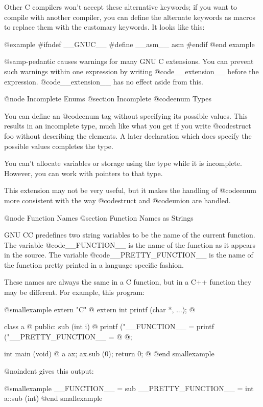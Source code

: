 {{{{{Other C compilers won't accept these alternative keywords; if you want to
compile with another compiler, you can define the alternate keywords as
macros to replace them with the customary keywords.  It looks like this:

@example
#ifndef __GNUC__
#define __asm__ asm
#endif
@end example

@samp{-pedantic} causes warnings for many GNU C extensions.  You can
prevent such warnings within one expression by writing
@code{__extension__} before the expression.  @code{__extension__} has no
effect aside from this.

@node Incomplete Enums
@section Incomplete @code{enum} Types

You can define an @code{enum} tag without specifying its possible values.
This results in an incomplete type, much like what you get if you write
@code{struct foo} without describing the elements.  A later declaration
which does specify the possible values completes the type.

You can't allocate variables or storage using the type while it is
incomplete.  However, you can work with pointers to that type.

This extension may not be very useful, but it makes the handling of
@code{enum} more consistent with the way @code{struct} and @code{union}
are handled.

@node Function Names
@section Function Names as Strings

GNU CC predefines two string variables to be the name of the current function.
The variable @code{__FUNCTION__} is the name of the function as it appears
in the source.  The variable @code{__PRETTY_FUNCTION__} is the name of
the function pretty printed in a language specific fashion.

These names are always the same in a C function, but in a C++ function
they may be different.  For example, this program:

@smallexample
extern "C" @{
extern int printf (char *, ...);
@}

class a @{
 public:
  sub (int i)
    @{
      printf ("__FUNCTION__ = %
      printf ("__PRETTY_FUNCTION__ = %
    @}
@};

int
main (void)
@{
  a ax;
  ax.sub (0);
  return 0;
@}
@end smallexample

@noindent
gives this output:

@smallexample
__FUNCTION__ = sub
__PRETTY_FUNCTION__ = int  a::sub (int)
@end smallexample

}}}}}
